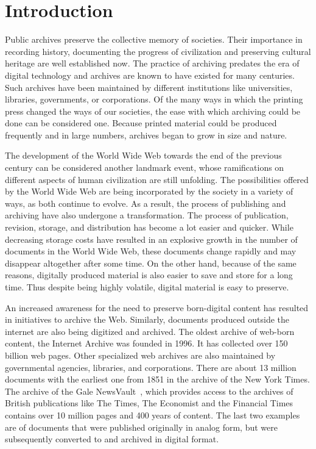 \chapter{Introduction}
\label{ch:intro}

Public archives preserve the collective memory of societies. Their importance
in recording history, documenting the progress of civilization and
preserving cultural heritage are well established now. The practice of
archiving predates the era of digital technology and archives are known to have
existed for many centuries. Such archives have been maintained by different
institutions like universities, libraries, governments, or corporations. Of the
many ways in which the printing press changed the ways of our societies, the
ease with which archiving could be done can be considered one. Because printed
material could be produced frequently and in large numbers, archives began to
grow in size and nature. 

The development of the World Wide Web towards the end of the previous century
can be considered another landmark event, whose ramifications on different
aspects of human civilization are still unfolding. The possibilities offered by
the World Wide Web are being incorporated by the society in a variety of
ways, as both continue to evolve. As a result, the process of publishing and
archiving have also undergone a transformation. The process of publication,
revision, storage, and distribution has become a lot easier and quicker. While
decreasing storage costs have resulted in an explosive growth in the number of
documents in the World Wide Web, these documents change rapidly and may
disappear altogether after some time. On the other hand, because of the same
reasons, digitally produced material is also easier to save and store for a
long time. Thus despite being highly volatile, digital material is easy to
preserve. 

An increased awareness for the need to preserve born-digital content has resulted in
initiatives to archive the Web. Similarly, documents produced outside the
internet are also being digitized and archived. The oldest archive of web-born
content, the Internet Archive was founded in 1996. It has collected over 150
billion web pages. Other specialized web archives are also maintained by
governmental agencies, libraries, and corporations. There are about 13 million
documents with the earliest one from 1851 in the archive of the New York Times.
The archive of the Gale NewsVault~\cite{Gale}, which provides access to the archives of 
British publications like The Times, The Economist and the Financial Times
contains over 10 million pages and 400 years of content. The last two examples
are of documents that were published originally in analog form, but were
subsequently converted to and archived in digital format.

